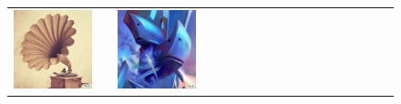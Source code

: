 \begin{figure}[ht!]
\begin{adjustwidth}{-0.8in}{-0.5in}
\begin{tabular}{cccccccccccccccccccc}
\multicolumn{2}{c}{\includegraphics[width=\threebythreecolwidth\textwidth]{figures/cherries/cardboard_phonograph_2.jpg}} &&
\multicolumn{2}{c}{\includegraphics[width=\threebythreecolwidth\textwidth]{figures/cherries/sharks_cubism.jpg}} &

\end{tabular}
\end{adjustwidth}
\end{figure}
